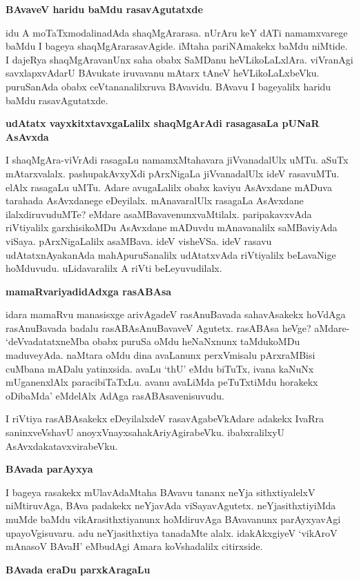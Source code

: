 \noindent
{\bf\large{BAvaveV haridu baMdu rasavAgutatxde}}\label{page229}

idu A moTaTxmodalinadAda shaqMgArarasa. nUrAru keY dATi namamxvarege baMdu I bageya shaqMgArarasavAgide. iMtaha pariNAmakekx baMdu niMtide. I dajeRya shaqMgAravanUnx saha obabx SaMDanu heVLikoLaLxlAra. viVranAgi savxlapxvAdarU BAvukate iruvavanu mAtarx tAneV heVLikoLaLxbeVku. puruSanAda obabx ceVtananalilxruva BAvavidu. BAvavu I bageyalilx haridu baMdu rasavAgutatxde.

\noindent
{\bf\large{udAtatx vayxkitxtavxgaLalilx shaqMgArAdi rasagasaLa pUNaR AsAvxda}}

I shaqMgAra-viVrAdi rasagaLu namamxMtahavara jiVvanadalUlx uMTu. aSuTx mAtarxvalalx. pashupakAvxyXdi pArxNigaLa jiVvanadalUlx ideV rasavuMTu. elAlx rasagaLu uMTu. Adare avugaLalilx obabx kaviyu AsAvxdane mADuva tarahada AsAvxdanege eDeyilalx. mAnavaralUlx rasagaLa AsAvxdane ilalxdiruvuduMTe? eMdare asaMBavavenunxvaMtilalx. paripakavxvAda riVtiyalilx garxhisikoMDu AsAvxdane mADuvdu mAnavanalilx saMBaviyAda viSaya. pArxNigaLalilx asaMBava. ideV visheVSa. ideV rasavu udAtatxnAyakanAda mahApuruSanalilx udAtatxvAda riVtiyalilx beLavaNige hoMduvudu. uLidavaralilx A riVti beLeyuvudilalx.

\noindent
{\bf\large{mamaRvariyadidAdxga rasABAsa}}\label{page229}

idara mamaRvu manasisxge arivAgadeV rasAnuBavada sahavAsakekx hoVdAga rasAnuBavada badalu rasABAsAnuBavaveV Agutetx. rasABAsa heVge? aMdare- `deVvadatatxneMba obabx puruSa oMdu heNaNxnunx taMdukoMDu maduveyAda. naMtara oMdu dina avaLanunx perxVmisalu pArxraMBisi cuMbana mADalu yatinxsida. avaLu `thU' eMdu biTuTx, ivana kaNuNx mUganenxlAlx paracibiTaTxLu. avanu avaLiMda peTuTxtiMdu horakekx oDibaMda' eMdelAlx AdAga rasABAsavenisuvudu.

I riVtiya rasABAsakekx eDeyilalxdeV rasavAgabeVkAdare adakekx IvaRra saninxveVshavU anoyxVnayxsahakAriyAgirabeVku. ibabxralilxyU AsAvxdakatavxvirabeVku.

\noindent
{\bf\large{BAvada parAyxya}}\label{page230}

I bageya rasakekx mUlavAdaMtaha BAvavu tananx neYja sithxtiyalelxV niMtiruvAga, BAva padakekx neYjavAda viSayavAgutetx. neYjasithxtiyiMda muMde baMdu vikArasithxtiyanunx hoMdiruvAga BAvavanunx parAyxyavAgi upayoVgisuvaru. adu neYjasithxtiya tanadaMte alalx. idakAkxgiyeV `vikAroV mAnasoV BAvaH'\label{230} eMbudAgi Amara koVshadalilx citirxside.

\noindent
{\bf\large{BAvada eraDu parxkAragaLu}}\label{page230}

